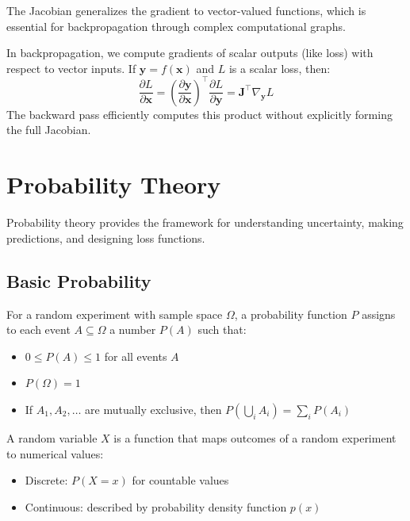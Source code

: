 The Jacobian generalizes the gradient to vector-valued functions, which is essential for backpropagation through complex computational graphs.

\begin{example}
In backpropagation, we compute gradients of scalar outputs (like loss) with respect to vector inputs. If $\mathbf{y} = f(\mathbf{x})$ and $L$ is a scalar loss, then:
\begin{equation}
\frac{\partial L}{\partial \mathbf{x}} = \left(\frac{\partial \mathbf{y}}{\partial \mathbf{x}}\right)^\top \frac{\partial L}{\partial \mathbf{y}} = \mathbf{J}^\top \nabla_\mathbf{y} L
\end{equation}
The backward pass efficiently computes this product without explicitly forming the full Jacobian.
\end{example}

\section{Probability Theory}

Probability theory provides the framework for understanding uncertainty, making predictions, and designing loss functions.

\subsection{Basic Probability}

\begin{definition}[Probability]
For a random experiment with sample space $\Omega$, a probability function $P$ assigns to each event $A \subseteq \Omega$ a number $P(A)$ such that:
\begin{itemize}
    \item $0 \leq P(A) \leq 1$ for all events $A$
    \item $P(\Omega) = 1$
    \item If $A_1, A_2, \ldots$ are mutually exclusive, then $P(\bigcup_i A_i) = \sum_i P(A_i)$
\end{itemize}
\end{definition}

\begin{definition}
A random variable $X$ is a function that maps outcomes of a random experiment to numerical values:
\begin{itemize}
    \item Discrete: $P(X = x)$ for countable values
    \item Continuous: described by probability density function $p(x)$
\end{itemize}
\end{definition}

